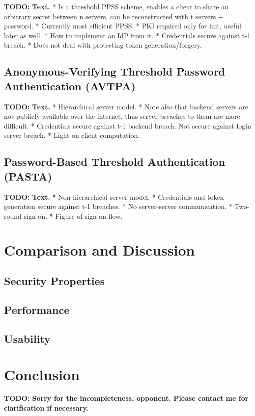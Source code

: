 \documentclass[article]{aaltoseries}
\newcommand{\todo}[1]{}
\renewcommand{\todo}[1]{{\color{red} \textbf{TODO: {#1}}}}
\begin{document}
\todo{Text.}
* Is a threshold PPSS scheme, enables a client to share an arbitrary secret between n servers, can be reconstructed with t servers + password.
* Currently most efficient PPSS.
* PKI required only for init, useful later as well.
* How to implement an IdP from it.
* Credentials secure against t-1 breach.
* Does not deal with protecting token generation/forgery.


\subsection{Anonymous-Verifying Threshold Password Authentication (AVTPA)}

\todo{Text.}
* Hierarchical server model.
* Note also that backend servers are not publicly available over the internet, thus server breaches to them are more difficult.
* Credentials secure against t-1 backend breach. Not secure against login server breach.
* Light on client computation.


\subsection{Password-Based Threshold Authentication (PASTA)}

\todo{Text.}
* Non-hierarchical server model.
* Credentials and token generation secure against t-1 breaches.
* No server-server communication.
* Two-round sign-on.
* Figure of sign-on flow.


\section{Comparison and Discussion}
\label{sec:comparison}

\subsection{Security Properties}

\subsection{Performance}

\subsection{Usability}


\section{Conclusion}
\label{sec:conclusion}

\todo{Sorry for the incompleteness, opponent. Please contact me for clarification if necessary.}




\end{document}
